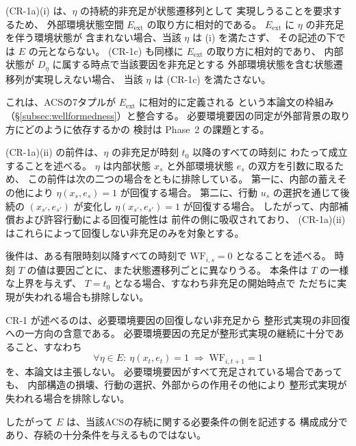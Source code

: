 \begin{remark}[(CR-1a)(i) の外部背景相対性]
\label{rem:cr1_relativity}
(CR-1a)(i) は、$\eta$ の持続的非充足が状態遷移列として
実現しうることを要求するため、
外部環境状態空間 $E_{\mathrm{ext}}$ の取り方に相対的である。
$E_{\mathrm{ext}}$ に $\eta$ の非充足を伴う環境状態が
含まれない場合、当該 $\eta$ は (i) を満たさず、
その記述の下では $E$ の元とならない。
(CR-1c) も同様に $E_{\mathrm{ext}}$ の取り方に相対的であり、
内部状態が $D_\eta$ に属する時点で当該要因を非充足とする
外部環境状態を含む状態遷移列が実現しえない場合、
当該 $\eta$ は (CR-1c) を満たさない。

これは、ACSの7タプルが $E_{\mathrm{ext}}$ に相対的に定義される
という本論文の枠組み（\S\ref{subsec:wellformedness}）と整合する。
必要環境要因の同定が外部背景の取り方にどのように依存するかの
検討は Phase~2 の課題とする。
\end{remark}

\begin{remark}[(CR-1a)(ii) の量化の読み方]
\label{rem:cr1_quantification}
(CR-1a)(ii) の前件は、$\eta$ の非充足が時刻 $t_0$ 以降のすべての時刻に
わたって成立することを述べる。
$\eta$ は内部状態 $x_s$ と外部環境状態 $e_s$ の双方を引数に取るため、
この前件は次の二つの場合をともに排除している。
第一に、内部の蓄えその他により $\eta(x_s,e_s)=1$ が回復する場合。
第二に、行動 $u_s$ の選択を通じて後続の
$(x_{s'},e_{s'})$ が変化し $\eta(x_{s'},e_{s'})=1$ が回復する場合。
したがって、内部補償および許容行動による回復可能性は
前件の側に吸収されており、
(CR-1a)(ii) はこれらによって回復しない非充足のみを対象とする。

後件は、ある有限時刻以降すべての時刻で
$\mathrm{WF}_{i,s}=0$ となることを述べる。
時刻 $T$ の値は要因ごとに、また状態遷移列ごとに異なりうる。
本条件は $T$ の一様な上界を与えず、
$T=t_0$ となる場合、すなわち非充足の開始時点で
ただちに実現が失われる場合も排除しない。
\end{remark}

\begin{remark}[必要条件であって十分条件ではない]
\label{rem:cr1_one_way}
CR-1 が述べるのは、必要環境要因の回復しない非充足から
整形式実現の非回復への一方向の含意である。
必要環境要因の充足が整形式実現の継続に十分であること、すなわち
\[
  \forall \eta\in E:\ \eta(x_t,e_t)=1
  \;\Longrightarrow\;
  \mathrm{WF}_{i,t+1}=1
\]
を、本論文は主張しない。
必要環境要因がすべて充足されている場合であっても、
内部構造の損壊、行動の選択、外部からの作用その他により
整形式実現が失われる場合を排除しない。

したがって $E$ は、当該ACSの存続に関する必要条件の側を記述する
構成成分であり、存続の十分条件を与えるものではない。
\end{remark}

